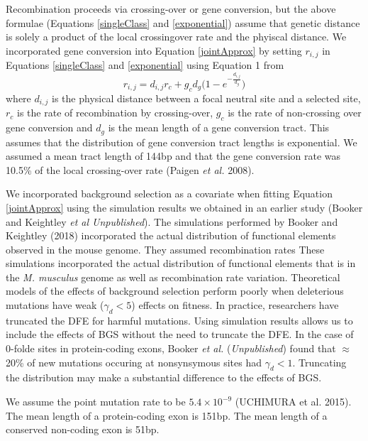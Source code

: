 \documentclass[11pt]{article}
\begin{document}
Recombination proceeds via crossing-over or gene conversion, but the above formulae (Equations \ref{singleClass} and \ref{exponential}) assume that genetic distance is solely a product of the local crossingover rate and the phyiscal distance.  We incorporated gene conversion into Equation \ref{jointApprox} by setting $r_{i,j}$ in Equations \ref{singleClass} and \ref{exponential} using Equation 1 from \cite{RN361}
		\begin{equation}
		\label{geneConversion}
		r_{i,j} = d_{i,j} r_c + g_c d_g \Bigg( 1 - e ^{-\frac{d_{i,j}}{d_g}} \Bigg)
		\end{equation}
	where $d_{i,j}$ is the physical distance between a focal neutral site and a selected site, $r_c$ is the rate of recombination by crossing-over, $g_c$ is the rate of non-crossing over gene conversion and $d_g$ is the mean length of a gene conversion tract. This assumes that the distribution of gene conversion tract lengths is exponential. We assumed a mean tract length of 144bp and that the gene conversion rate was 10.5\% of the local crossing-over rate (Paigen \textit{et al.} 2008).

	
 	We incorporated background selection as a covariate when fitting Equation \ref{jointApprox} using the simulation results we obtained in an earlier study (Booker and Keightley \textit{et al Unpublished}). The simulations performed by Booker and Keightley (2018) incorporated the actual distribution of functional elements observed in the mouse genome. They assumed recombination rates 
 	These simulations incorporated the actual distribution of functional elements that is in the \textit{M. musculus} genome as well as recombination rate variation. Theoretical models of the effects of background selection perform poorly when deleterious mutations have weak ($\gamma_d < 5$) 	effects on fitness. In practice, researchers have truncated the DFE for harmful mutations. Using simulation results allows us to include the effects of BGS without the need to truncate the DFE. In the case of 0-folde sites in protein-coding exons, Booker \textit{et al.} (\textit{Unpublished}) found that $\approx$ 20\% of new mutations occuring at nonsynsymous sites had $\gamma_d < 1$. Truncating the distribution may make a substantial difference to the effects of BGS. 
 	
	We assume the point mutation rate to be $5.4 \times 10^{-9}$ (UCHIMURA et al. 2015).
 	The mean length of a protein-coding exon is 151bp.
 	The mean length of a conserved non-coding exon is 51bp.
 	
\end{document}
